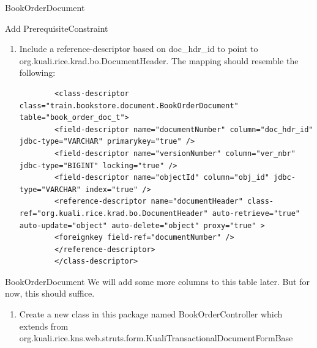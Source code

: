\documentclass[xcolor=dvipsnames,14pt,professionalfonts]{beamer}
\begin{document}
\begin{frame}{BookOrderDocument}
\begin{enumerate}
\begin{frame}[fragile]{Add PrerequisiteConstraint}
\begin{enumerate}
    \item Include a reference-descriptor based on doc_hdr_id to point to org.kuali.rice.krad.bo.DocumentHeader.
      The mapping should resemble the following:
      \begin{verbatim}
        <class-descriptor class="train.bookstore.document.BookOrderDocument" table="book_order_doc_t">
        <field-descriptor name="documentNumber" column="doc_hdr_id" jdbc-type="VARCHAR" primarykey="true" />
        <field-descriptor name="versionNumber" column="ver_nbr" jdbc-type="BIGINT" locking="true" />
        <field-descriptor name="objectId" column="obj_id" jdbc-type="VARCHAR" index="true" />
        <reference-descriptor name="documentHeader" class-ref="org.kuali.rice.krad.bo.DocumentHeader" auto-retrieve="true" auto-update="object" auto-delete="object" proxy="true" >
       	<foreignkey field-ref="documentNumber" />
        </reference-descriptor>
        </class-descriptor>
      \end{verbatim}
    \end{enumerate}
\end{frame}

\begin{frame}{BookOrderDocument}
We will add some more columns to this table later.  But for now, this should suffice.
\begin{enumerate}
\item  Create a new class in this package named BookOrderController which
  extends from
  org.kuali.rice.kns.web.struts.form.KualiTransactionalDocumentFormBase
\end{enumerate}
\end{frame}


\end{enumerate}
\end{frame}
\end{document}
